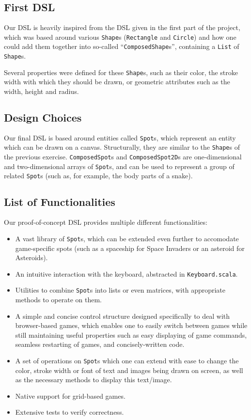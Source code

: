 \documentclass[journal,onecolumn, 9pt]{IEEEtran}
\theoremstyle{definition}
\newcommand{\scala}[1]{\texttt{#1}}
\begin{document}
\subsection{First DSL}
Our DSL is heavily inspired from the DSL given in the first part of the project, which was based around various \scala{Shape}s (\scala{Rectangle} and \scala{Circle}) and how one could add them together into so-called ``\scala{ComposedShape}s'', containing a \scala{List} of \scala{Shape}s.

Several properties were defined for these \scala{Shape}s, such as their color, the stroke width with which they should be drawn, or geometric attributes such as the width, height and radius.

\subsection{Design Choices}
Our final DSL is based around entities called \scala{Spot}s, which represent an entity which can be drawn on a canvas.
Structurally, they are similar to the \scala{Shape}s of the previous exercise.
\scala{ComposedSpot}s and \scala{ComposedSpot2D}s are one-dimensional and two-dimensional arrays of \scala{Spot}s, and can be used to represent a group of related \scala{Spot}s (such as, for example, the body parts of a snake).

\subsection{List of Functionalities}
Our proof-of-concept DSL provides multiple different functionalities:
\begin{itemize}
	\item A vast library of \scala{Spot}s, which can be extended even further to accomodate game-specific spots (such as a spaceship for Space Invaders or an asteroid for Asteroids).
	\item An intuitive interaction with the keyboard, abstracted in \texttt{Keyboard.scala}.
	\item Utilities to combine \scala{Spot}s into lists or even matrices, with appropriate methods to operate on them.
	\item A simple and concise control structure designed specifically to deal with browser-based games, which enables one to easily switch between games while still maintaining useful properties such as easy displaying of game commands, seamless restarting of games, and concisely-written code.
	\item A set of operations on \scala{Spot}s which one can extend with ease to change the color, stroke width or font of text and images being drawn on screen, as well as the necessary methods to display this text/image.
	\item Native support for grid-based games.
	\item Extensive tests to verify correctness.
\end{itemize}
\end{document}

